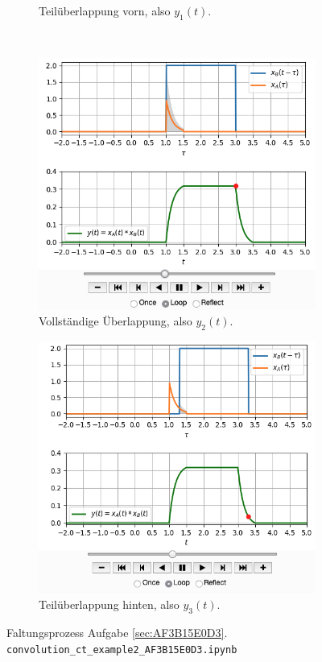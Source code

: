 \documentclass[11pt,a4paper,DIV=12]{scrartcl}
\numberwithin{equation}{section}
\numberwithin{figure}{section}
\begin{document}
\begin{figure}[h!]
\begin{subfigure}{0.45\textwidth}
\caption{Teilüberlappung vorn, also $y_1(t)$.}
\label{fig:AF3B15E0D3_v2_1}
\end{subfigure}
\\
\begin{subfigure}{0.45\textwidth}
\centering
\includegraphics[width=\textwidth]{../convolution_ct/conv_var2_2_AF3B15E0D3.png}
\caption{Vollständige Überlappung, also $y_2(t)$.}
\label{fig:AF3B15E0D3_v2_2}
\end{subfigure}
\begin{subfigure}{0.45\textwidth}
\centering
\includegraphics[width=\textwidth]{../convolution_ct/conv_var2_3_AF3B15E0D3.png}
\caption{Teilüberlappung hinten, also $y_3(t)$.}
\label{fig:AF3B15E0D3_v2_3}
\end{subfigure}
%
\caption{Faltungsprozess Aufgabe \ref{sec:AF3B15E0D3}.
\texttt{convolution\_ct\_example2\_AF3B15E0D3.ipynb}}
\label{fig:AF3B15E0D3_v2}
\end{figure}
\end{document}
